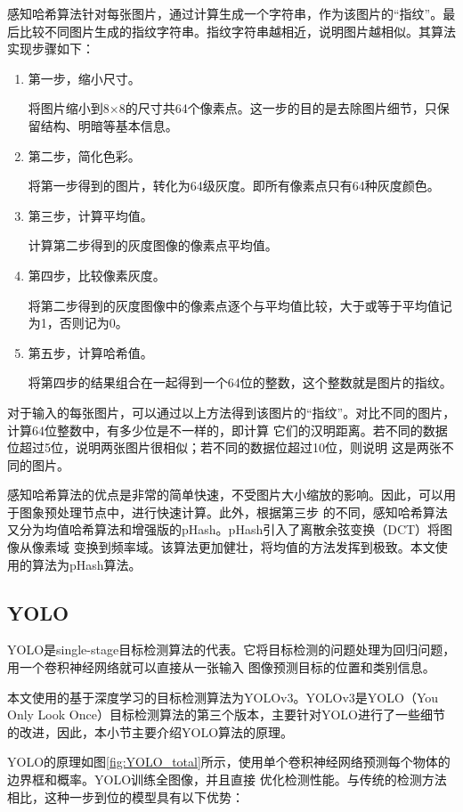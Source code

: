 感知哈希算法针对每张图片，通过计算生成一个字符串，作为该图片的“指纹”。最后比较不同图片生成的指纹字符串。指纹字符串越相近，说明图片越相似。其算法实现步骤如下：
\begin{enumerate}
    \item{第一步，缩小尺寸。
    
    将图片缩小到8×8的尺寸共64个像素点。这一步的目的是去除图片细节，只保留结构、明暗等基本信息。}
    \item{第二步，简化色彩。
    
    将第一步得到的图片，转化为64级灰度。即所有像素点只有64种灰度颜色。}
    \item{第三步，计算平均值。
    
    计算第二步得到的灰度图像的像素点平均值。}
    \item{第四步，比较像素灰度。
    
    将第二步得到的灰度图像中的像素点逐个与平均值比较，大于或等于平均值记为1，否则记为0。}
    \item{第五步，计算哈希值。
    
    将第四步的结果组合在一起得到一个64位的整数，这个整数就是图片的指纹。}
\end{enumerate}

对于输入的每张图片，可以通过以上方法得到该图片的“指纹”。对比不同的图片，计算64位整数中，有多少位是不一样的，即计算
它们的汉明距离\cite{hanming_distance}。若不同的数据位超过5位，说明两张图片很相似；若不同的数据位超过10位，则说明
这是两张不同的图片。

感知哈希算法的优点是非常的简单快速，不受图片大小缩放的影响。因此，可以用于图象预处理节点中，进行快速计算。此外，根据第三步
的不同，感知哈希算法又分为均值哈希算法和增强版的pHash\cite{pHash}。pHash引入了离散余弦变换\cite{DCT}（DCT）将图像从像素域
变换到频率域。该算法更加健壮，将均值的方法发挥到极致。本文使用的算法为pHash算法。

\subsection{YOLO}
YOLO是single-stage目标检测算法的代表。它将目标检测的问题处理为回归问题，用一个卷积神经网络就可以直接从一张输入
图像预测目标的位置和类别信息。

本文使用的基于深度学习的目标检测算法为YOLOv3。YOLOv3是YOLO（You Only Look Once）目标检测算法的第三个版本，主要针对YOLO进行了一些细节的改进，因此，本小节主要介绍YOLO算法的原理。

YOLO的原理如图\ref{fig:YOLO_total}\cite{YOLO2016}所示，使用单个卷积神经网络预测每个物体的边界框和概率。YOLO训练全图像，并且直接
优化检测性能。与传统的检测方法相比，这种一步到位的模型具有以下优势：

